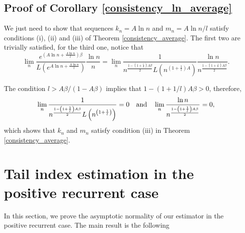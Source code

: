 \documentclass[sn-mathphys-ay]{sn-jnl}%
\begin{document}
\begin{appendices}
\subsection{Proof of Corollary \ref{consistency_ln_average}}

We just need to show that sequences \(k_n=A\ln n\) and \(m_n={A\ln n}/{l}\) satisfy
conditions (i), (ii) and (iii) of Theorem \ref{consistency_average}. The first two
are trivially satisfied, for the third one, notice that
\begin{equation*}
    \mathop {\lim }\limits_n \frac{{{e^{\left( {A\ln n + \frac{{A\ln n}}{l}} \right)\beta }}}}{{L\left( {{e^{A\ln n + \frac{{A\ln n}}{l}}}} \right)}}\frac{{\ln n}}{n} = \mathop {\lim }\limits_n \frac{1}{{{n^{\frac{{1 - \left( {1 + \frac{1}{l}} \right)A\beta }}{2}}}L\left( {{n^{\left( {1 + \frac{1}{l}} \right)A}}} \right)}}\frac{{\ln n}}{{{n^{\frac{{1 - \left( {1 + \frac{1}{l}} \right)A\beta }}{2}}}}}.
\end{equation*}

The condition $l>{A\beta}/{(1-A\beta)}$ implies that \(1 - \left( {1 + {1}/{l}}
\right)A\beta > 0\), therefore,
\begin{equation*}
    \mathop {\lim }\limits_n \frac{1}{{{n^{\frac{{1 - \left( {1 + \frac{1}{l}} \right)A\beta }}{2}}}L\left( {{n^{\left( {1 + \frac{1}{l}} \right)}}} \right)}} = 0\quad \textnormal{and}\quad \mathop {\lim }\limits_n \frac{{\ln n}}{{{n^{\frac{{1 - \left( {1 + \frac{1}{l}} \right)A\beta }}{2}}}}} = 0,
\end{equation*}
which shows that \(k_n\) and \(m_n\) satisfy condition (iii) in Theorem
\ref{consistency_average}.

\section{Tail index estimation in the positive recurrent case}\label{subsec:positive_recurrent_case}

In this section, we prove the asymptotic normality of our estimator in the positive
recurrent case. The main result is the following


\end{appendices}
\end{document}
